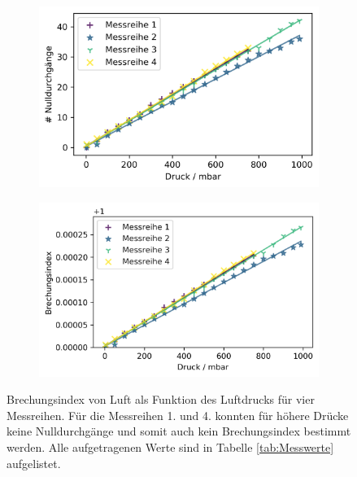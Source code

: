 \begin{figure}[H]
  \centering
  \begin{subfigure}[l]{.49\textwidth}
    \includegraphics[width = \textwidth]{Auswertung/Plots/Messwerte.png}
    \label{fig:Druck_M}
  \end{subfigure}
  \begin{subfigure}[r]{.49\textwidth}
    \includegraphics[width = \textwidth]{Auswertung/Plots/Brechungsindex.png}
    \label{fig:Druck_n}
  \end{subfigure}
  \caption{Brechungsindex von Luft als Funktion des Luftdrucks für vier Messreihen. Für die Messreihen 1. und 4. konnten für höhere Drücke keine Nulldurchgänge und somit auch kein Brechungsindex bestimmt werden. Alle aufgetragenen Werte sind in Tabelle \ref{tab:Messwerte} aufgelistet.}
  \label{fig:Druck}
\end{figure}


